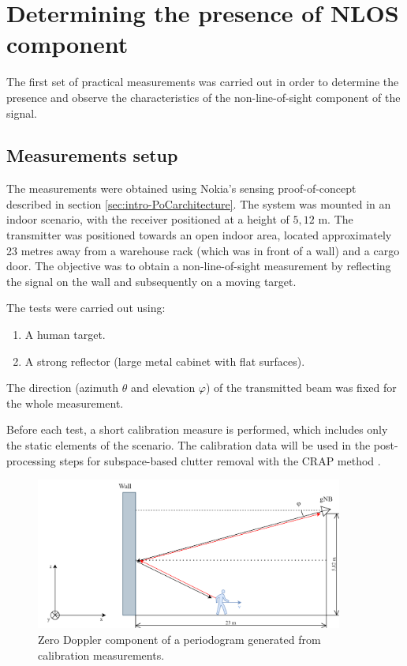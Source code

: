 \chapter{Determining the presence of NLOS component}

The first set of practical measurements was carried out in order to determine the presence and observe the characteristics of the non-line-of-sight component of the signal. 

\section{Measurements setup}

The measurements were obtained using Nokia's sensing proof-of-concept described in section \ref{sec:intro-PoCarchitecture}. The system was mounted in an indoor scenario, with the receiver positioned at a height of $5,12$ m. The transmitter was positioned towards an open indoor area, located approximately 23 metres away from a warehouse rack (which was in front of a wall) and a cargo door.
The objective was to obtain a non-line-of-sight measurement by reflecting the signal on the wall and subsequently on a moving target. 

The tests were carried out using:

\begin{enumerate}
	\item A human target.
	\item A strong reflector (large metal cabinet with flat surfaces).
\end{enumerate}

The direction (azimuth $\theta$ and elevation $\varphi$) of the transmitted beam was fixed for the whole measurement.

Before each test, a short calibration measure is performed, which includes only the static elements of the scenario. The calibration data will be used in the post-processing steps for subspace-based clutter removal with the CRAP method  \cite{Henninger_Mandelli_Grudnitsky_Wild_Brink_2023}. 


\begin{figure}[H]
	\centering
	\includegraphics[width=0.9\textwidth]{Images/Test1/base-lateral_view}
	\caption{Zero Doppler component of a periodogram generated from calibration measurements.}
	\label{fig:Test1_base-lateral_view}
\end{figure}

